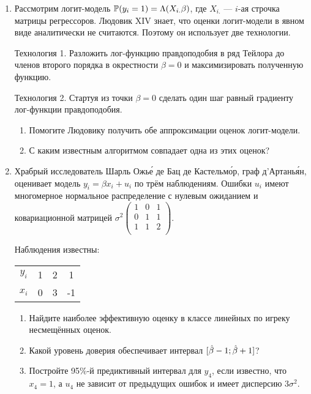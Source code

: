 \begin{enumerate}
\item Рассмотрим логит-модель $\P(y_i = 1) = \Lambda(X_{i.}\beta)$, где $X_{i.}$ — $i$-ая строчка матрицы
регрессоров. Людовик XIV знает, что оценки логит-модели в явном виде аналитически не считаются. Поэтому он использует две технологии.

Технология 1. Разложить лог-функцию правдоподобия в ряд Тейлора до членов второго порядка в окрестности $\beta=0$ и максимизировать полученную функцию.

Технология 2. Стартуя из точки $\beta = 0$ сделать один шаг равный градиенту лог-функции правдоподобия.


\begin{enumerate}
  \item Помогите Людовику получить обе аппроксимации оценок логит-модели.
  \item С каким известным алгоритмом совпадает одна из этих оценок?
\end{enumerate}


\item Храбрый исследователь Шарль Ожье́ де Бац де Кастельмо́р, граф д'Артанья́н, оценивает модель $y_i = \beta x_i + u_i$ по трём наблюдениям.
Ошибки $u_i$ имеют многомерное нормальное распределение с нулевым ожиданием и ковариационной матрицей
$\sigma^2\begin{pmatrix}
1 & 0 & 1 \\
0 & 1 & 1 \\
1 & 1 & 2 \\
\end{pmatrix}$.

Наблюдения известны:

\begin{tabular}{cccc}
\toprule
$y_i$ & 1 & 2 & 1  \\
$x_i$ & 0 & 3 & -1 \\
\bottomrule
\end{tabular}


\begin{enumerate}
  \item Найдите наиболее эффективную оценку в классе линейных по игреку несмещённых оценок.
  \item Какой уровень доверия обеспечивает интервал $[\hb -1;\hb +1]$?
  \item Постройте 95\%-й предиктивный интервал для $y_4$, если известно, что $x_4=1$,
	а $u_4$ не зависит от предыдущих ошибок и имеет дисперсию $3\sigma^2$.
\end{enumerate}



\end{enumerate}
